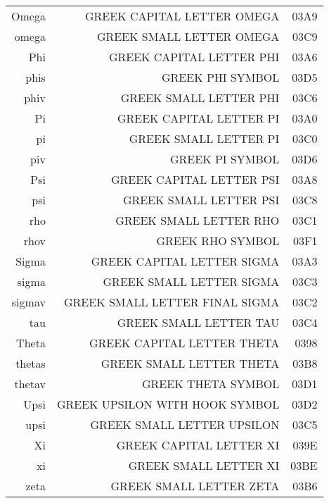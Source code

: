 \documentclass{article}
\begin{document}
\begin{supertabular}{rrr}
Omega              & GREEK CAPITAL LETTER OMEGA          & 03A9\\
omega              & GREEK SMALL LETTER OMEGA            & 03C9\\
Phi                & GREEK CAPITAL LETTER PHI            & 03A6\\
phis               & GREEK PHI SYMBOL                    & 03D5\\
phiv               & GREEK SMALL LETTER PHI              & 03C6\\
Pi                 & GREEK CAPITAL LETTER PI             & 03A0\\
pi                 & GREEK SMALL LETTER PI               & 03C0\\
piv                & GREEK PI SYMBOL                     & 03D6\\
Psi                & GREEK CAPITAL LETTER PSI            & 03A8\\
psi                & GREEK SMALL LETTER PSI              & 03C8\\
rho                & GREEK SMALL LETTER RHO              & 03C1\\
rhov               & GREEK RHO SYMBOL                    & 03F1\\
Sigma              & GREEK CAPITAL LETTER SIGMA          & 03A3\\
sigma              & GREEK SMALL LETTER SIGMA            & 03C3\\
sigmav             & GREEK SMALL LETTER FINAL SIGMA      & 03C2\\
tau                & GREEK SMALL LETTER TAU              & 03C4\\
Theta              & GREEK CAPITAL LETTER THETA          & 0398\\
thetas             & GREEK SMALL LETTER THETA            & 03B8\\
thetav             & GREEK THETA SYMBOL                  & 03D1\\
Upsi               & GREEK UPSILON WITH HOOK SYMBOL      & 03D2\\
upsi               & GREEK SMALL LETTER UPSILON          & 03C5\\
Xi                 & GREEK CAPITAL LETTER XI             & 039E\\
xi                 & GREEK SMALL LETTER XI               & 03BE\\
zeta               & GREEK SMALL LETTER ZETA             & 03B6\\
\end{supertabular}
\end{document}
